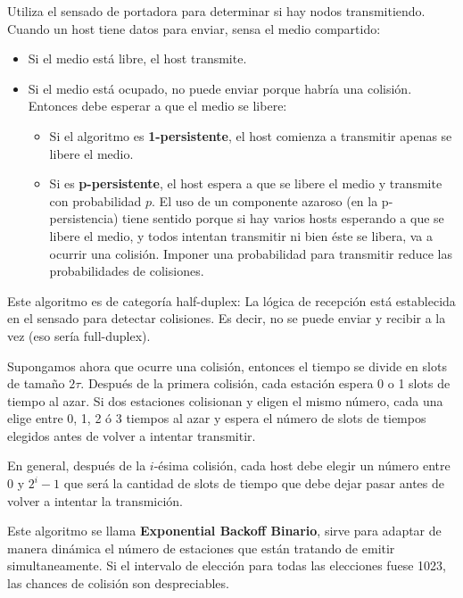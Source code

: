 Utiliza el sensado de portadora para determinar si hay nodos transmitiendo. Cuando un host tiene datos para enviar, sensa el medio compartido:
\begin{itemize}
  \item Si el medio está libre, el host transmite.
  \item Si el medio está ocupado, no puede enviar porque habría una colisión. Entonces debe esperar a que el medio se libere:
  \begin{itemize}
    \item Si el algoritmo es \textbf{1-persistente}, el host comienza a transmitir apenas se libere el medio.
    \item Si es \textbf{p-persistente}, el host espera a que se libere el medio y transmite con probabilidad \(p\). El uso de un componente azaroso (en la p-persistencia) tiene sentido porque si hay varios
    hosts esperando a que se libere el medio, y todos intentan transmitir ni bien éste se libera, va
    a ocurrir una colisión. Imponer una probabilidad para transmitir reduce las probabilidades de
    colisiones.
  \end{itemize}
\end{itemize}

Este algoritmo es de categoría half-duplex: La lógica de recepción está establecida en el sensado para detectar colisiones. Es decir, no se puede enviar y recibir a la vez (eso sería full-duplex).

Supongamos ahora que ocurre una colisión, entonces el tiempo se divide en slots de tamaño \(2\tau\). Después de la primera colisión, cada estación espera 0 o 1 slots de tiempo al azar. Si dos estaciones colisionan y eligen el mismo número, cada una elige entre 0, 1, 2 ó 3 tiempos al azar y espera el número de slots de tiempos elegidos antes de volver a intentar transmitir.

En general, después de la \(i\)-ésima colisión, cada host debe elegir un número entre 0 y \(2^i-1\) que será la cantidad de slots de tiempo que debe dejar pasar antes de volver a intentar la transmición.

Este algoritmo se llama \textbf{Exponential Backoff Binario}, sirve para adaptar de manera dinámica el número de estaciones que están tratando de emitir simultaneamente. Si el intervalo de elección para todas las elecciones fuese 1023, las chances de colisión son despreciables.


